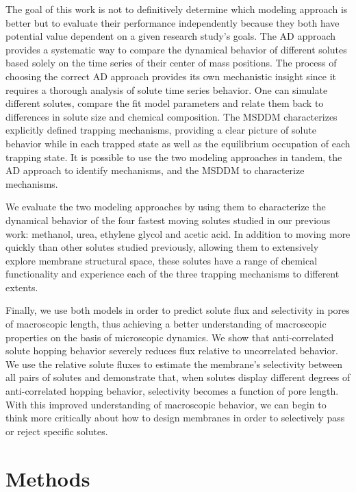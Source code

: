 \documentclass[aps,pre,preprint,groupedaddress,longbibliography]{revtex4-2}
\begin{document}
  The goal of this work is not to definitively determine which modeling
  approach is better but to evaluate their performance independently because
  they both have potential value dependent on a given research study's goals.
  The AD approach provides a systematic way to compare the dynamical behavior
  of different solutes based solely on the time series of their center of mass
  positions. The process of choosing the correct AD approach provides its own
  mechanistic insight since it requires a thorough analysis of solute time
  series behavior. One can simulate different solutes, compare the fit model
  parameters and relate them back to differences in solute size and chemical
  composition. The MSDDM characterizes explicitly defined trapping mechanisms,
  providing a clear picture of solute behavior while in each trapped state as
  well as the equilibrium occupation of each trapping state.  It is possible to
  use the two modeling approaches in tandem, the AD approach to identify
  mechanisms, and the MSDDM to characterize mechanisms. 
  
  We evaluate the two modeling approaches by using them to characterize the
  dynamical behavior of the four fastest moving solutes studied in our previous
  work: methanol, urea, ethylene glycol and acetic acid. In addition to moving
  more quickly than other solutes studied previously, allowing them to extensively
  explore membrane structural space, these solutes have a range of chemical 
  functionality and experience each of the three trapping mechanisms to different extents.
  
  Finally, we use both models in order to predict solute flux and selectivity
  in pores of macroscopic length, thus achieving a better understanding of
  macroscopic properties on the basis of microscopic dynamics. We show that
  anti-correlated solute hopping behavior severely reduces flux relative to
  uncorrelated behavior. We use the relative solute fluxes to estimate the
  membrane's selectivity between all pairs of solutes and demonstrate that,
  when solutes display different degrees of anti-correlated hopping behavior,
  selectivity becomes a function of pore length. With this improved
  understanding of macroscopic behavior, we can begin to think more critically
  about how to design membranes in order to selectively pass or reject specific
  solutes.

  \section{Methods}
    
\end{document}
